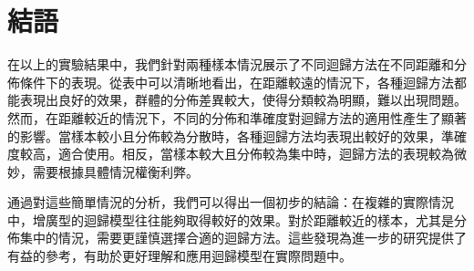 \documentclass[12pt, a4paper]{article}
\begin{document}
\section{結語}
在以上的實驗結果中，我們針對兩種樣本情況展示了不同迴歸方法在不同距離和分佈條件下的表現。從表中可以清晰地看出，在距離較遠的情況下，各種迴歸方法都能表現出良好的效果，群體的分佈差異較大，使得分類較為明顯，難以出現問題。然而，在距離較近的情況下，不同的分佈和準確度對迴歸方法的適用性產生了顯著的影響。當樣本較小且分佈較為分散時，各種迴歸方法均表現出較好的效果，準確度較高，適合使用。相反，當樣本較大且分佈較為集中時，迴歸方法的表現較為微妙，需要根據具體情況權衡利弊。

通過對這些簡單情況的分析，我們可以得出一個初步的結論：在複雜的實際情況中，增廣型的迴歸模型往往能夠取得較好的效果。對於距離較近的樣本，尤其是分佈集中的情況，需要更謹慎選擇合適的迴歸方法。這些發現為進一步的研究提供了有益的參考，有助於更好理解和應用迴歸模型在實際問題中。
\end{document}

